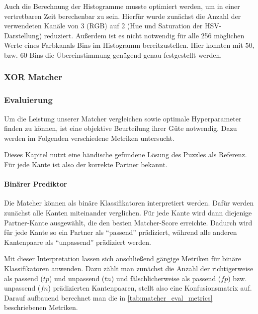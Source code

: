 Auch die Berechnung der Histogramme musste optimiert werden, um in einer vertretbaren Zeit berechenbar zu sein. Hierfür wurde zunächst die Anzahl der verwendeten Kanäle von 3 (RGB) auf 2 (Hue und Saturation der HSV-Darstellung) reduziert. Außerdem ist es nicht notwendig für alle 256 möglichen Werte eines Farbkanals Bins im Histogramm bereitzustellen. Hier konnten mit 50, bzw. 60 Bins die Übereinstimmung genügend genau festgestellt werden.

\subsubsection[XOR Matcher]{XOR Matcher }


\subsubsection[Evaluierung]{Evaluierung }
\label{sec:matcher_evaluation}

Um die Leistung unserer Matcher vergleichen sowie optimale Hyperparameter finden 
zu können, ist eine objektive Beurteilung ihrer Güte notwendig. Dazu werden im
Folgenden verschiedene Metriken untersucht.

Dieses Kapitel nutzt eine händische gefundene Lösung des Puzzles als
Referenz. Für jede Kante ist also der korrekte Partner bekannt.

\paragraph{Binärer Prediktor}

Die Matcher können als binäre Klassifikatoren interpretiert werden.
Dafür werden zunächst alle Kanten miteinander verglichen. Für jede Kante
wird dann diejenige Partner-Kante ausgewählt, die den besten
Matcher-Score erreichte. Dadurch wird für jede Kante so ein Partner als
``passend'' prädiziert, während alle anderen Kantenpaare als
``unpassend'' prädiziert werden.

Mit dieser Interpretation lassen sich anschließend gängige Metriken für
binäre Klassifikatoren anwenden. Dazu zählt man zunächst die Anzahl der
richtigerweise als passend ($tp$) und unpassend ($tn$) und
fälschlicherweise als passend ($fp$) bzw. unpassend ($fn$)
prädizierten Kantenpaaren, stellt also eine Konfusionsmatrix auf. Darauf
aufbauend berechnet man die in \autoref{tab:matcher_eval_metrics} beschriebenen Metriken.


